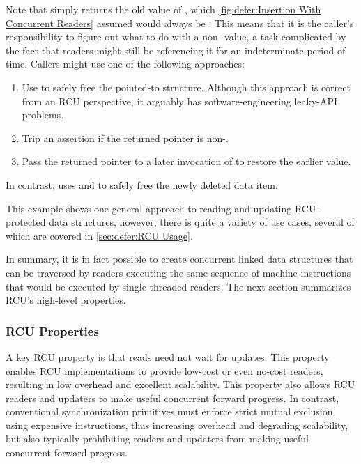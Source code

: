 Note that  simply returns the old value of , which
\cref{fig:defer:Insertion With Concurrent Readers} assumed would
always be .
This means that it is the caller's responsibility to figure out what to
do with a non- value, a task complicated by the fact that
readers might still be referencing it for an indeterminate period of time.
Callers might use one of the following approaches:

\begin{enumerate}
\item	Use  to safely free the pointed-to structure.
	Although this approach is correct from an RCU perspective, it
	arguably has software-engineering leaky-API problems.
\item	Trip an assertion if the returned pointer is non-.
\item	Pass the returned pointer to a later invocation of
	 to restore the earlier value.
\end{enumerate}

In contrast,  uses  and
 to safely free the newly deleted data item.

\QuickQuizEnd

This example shows one general approach to reading and updating
RCU-protected data structures, however, there is quite a variety
of use cases, several of which are covered in
\cref{sec:defer:RCU Usage}.

In summary, it is in fact possible to create concurrent linked data
structures that can be traversed by readers executing the same sequence
of machine instructions that would be executed by single-threaded readers.
The next section summarizes RCU's high-level properties.

\subsubsection{RCU Properties}
\label{sec:defer:RCU Properties}

A key RCU property is that reads need not wait for updates.
This property enables RCU implementations to provide low-cost or even
no-cost readers, resulting in low overhead and excellent scalability.
This property also allows RCU readers and updaters to make useful
concurrent forward progress.
In contrast, conventional synchronization primitives must enforce strict
mutual exclusion using expensive instructions, thus increasing overhead
and degrading scalability, but also typically prohibiting readers and
updaters from making useful concurrent forward progress.

